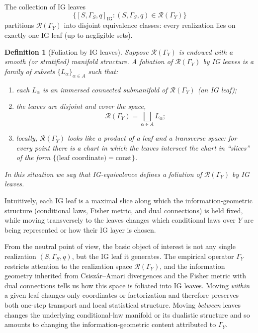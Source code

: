 \documentclass[11pt]{article}
\newtheorem{definition}{Definition}
\newcommand{\1}{\mathbf{1}}
\begin{document}
The collection of IG leaves
\[
  \bigl\{[S,\Gamma_S,q]_{\mathrm{IG}} : (S,\Gamma_S,q)\in\mathcal{R}(\Gamma_Y)\bigr\}
\]
partitions $\mathcal{R}(\Gamma_Y)$ into disjoint equivalence classes: every realization lies on exactly one IG leaf (up to negligible sets).

\begin{definition}[Foliation by IG leaves]
\label{def:ig-foliation}
Suppose $\mathcal{R}(\Gamma_Y)$ is endowed with a smooth (or stratified) manifold structure. A \emph{foliation of $\mathcal{R}(\Gamma_Y)$ by IG leaves} is a family of subsets $\{L_\alpha\}_{\alpha\in A}$ such that:
\begin{enumerate}[leftmargin=1.5em]
  \item each $L_\alpha$ is an immersed connected submanifold of
        $\mathcal{R}(\Gamma_Y)$ (an IG leaf);
  \item the leaves are disjoint and cover the space,
        \[
          \mathcal{R}(\Gamma_Y) = \bigsqcup_{\alpha\in A} L_\alpha;
        \]
  \item locally, $\mathcal{R}(\Gamma_Y)$ looks like a product of a leaf and a
        transverse space: for every point there is a chart in which the leaves
        intersect the chart in ``slices'' of the form
        $\{\text{(leaf coordinate)} = \text{const}\}$.
\end{enumerate}
In this situation we say that IG-equivalence defines a foliation of $\mathcal{R}(\Gamma_Y)$ by IG leaves.
\end{definition}

Intuitively, each IG leaf is a maximal slice along which the information-geometric structure (conditional laws, Fisher metric, and dual connections) is held fixed, while moving transversely to the leaves changes which conditional laws over $Y$ are being represented or how their IG layer is chosen.

From the neutral point of view, the basic object of interest is not any single realization $(S,\Gamma_S,q)$, but the IG leaf it generates. The empirical operator $\Gamma_Y$ restricts attention to the realization space $\mathcal{R}(\Gamma_Y)$, and the information geometry inherited from Csiszár--Amari divergences and the Fisher metric with dual connections tells us how this space is foliated into IG leaves. Moving \emph{within} a given leaf changes only coordinates or factorization and therefore preserves both one-step transport and local statistical structure. Moving \emph{between} leaves changes the underlying conditional-law manifold or its dualistic structure and so amounts to changing the information-geometric content attributed to $\Gamma_Y$.
\end{document}
